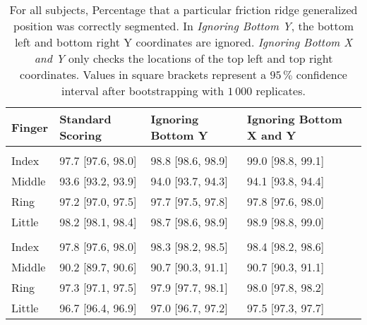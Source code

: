 \documentclass[]{article}
\begin{document}
\begin{table}[!h]

\caption{\label{tab:twoinch-per-frgp-ci}For all subjects, Percentage that a particular friction ridge generalized position was correctly segmented. In \textit{Ignoring Bottom Y}, the bottom left and bottom right Y coordinates are ignored. \textit{Ignoring Bottom X and Y} only checks the locations of the top left and top right coordinates. Values in square brackets represent a \(95\,\%\) confidence interval after bootstrapping with \(1\,000\) replicates.}
\centering
\begin{tabular}{llll}
\toprule
Finger & Standard Scoring & Ignoring Bottom Y & Ignoring Bottom X and Y\\
\midrule
\addlinespace[0.3em]
\multicolumn{4}{l}{\textbf{Right}}\\
\rowcolor{gray!6}  \hspace{1em}Index & 97.7 [97.6, 98.0] & 98.8 [98.6, 98.9] & 99.0 [98.8, 99.1]\\
\hspace{1em}Middle & 93.6 [93.2, 93.9] & 94.0 [93.7, 94.3] & 94.1 [93.8, 94.4]\\
\rowcolor{gray!6}  \hspace{1em}Ring & 97.2 [97.0, 97.5] & 97.7 [97.5, 97.8] & 97.8 [97.6, 98.0]\\
\hspace{1em}Little & 98.2 [98.1, 98.4] & 98.7 [98.6, 98.9] & 98.9 [98.8, 99.0]\\
\addlinespace[0.3em]
\multicolumn{4}{l}{\textbf{Left}}\\
\rowcolor{gray!6}  \hspace{1em}Index & 97.8 [97.6, 98.0] & 98.3 [98.2, 98.5] & 98.4 [98.2, 98.6]\\
\hspace{1em}Middle & 90.2 [89.7, 90.6] & 90.7 [90.3, 91.1] & 90.7 [90.3, 91.1]\\
\rowcolor{gray!6}  \hspace{1em}Ring & 97.3 [97.1, 97.5] & 97.9 [97.7, 98.1] & 98.0 [97.8, 98.2]\\
\hspace{1em}Little & 96.7 [96.4, 96.9] & 97.0 [96.7, 97.2] & 97.5 [97.3, 97.7]\\
\bottomrule
\end{tabular}
\end{table}
\end{document}
